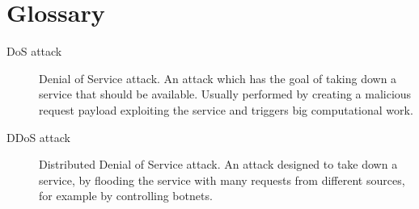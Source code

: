 \chapter*{Glossary}


\begin{description}
  \item[DoS attack] Denial of Service attack. An attack which has the goal of taking down a service that should be available. Usually performed by creating a malicious request payload exploiting the service and triggers big computational work.
  \item[DDoS attack] Distributed Denial of Service attack. An attack designed to take down a service, by flooding the service with many requests from different sources, for example by controlling botnets.
\end{description}
